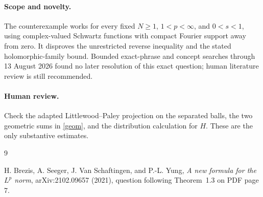 \documentclass[11pt]{article}
\begin{document}
\paragraph{Scope and novelty.}
The counterexample works for every fixed $N\ge1$, $1<p<\infty$, and
$0<s<1$, using complex-valued Schwartz functions with compact Fourier
support away from zero.  It disproves the unrestricted reverse inequality
and the stated holomorphic-family bound.  Bounded exact-phrase and concept
searches through 13 August 2026 found no later resolution of this exact
question; human literature review is still recommended.

\paragraph{Human review.}
Check the adapted Littlewood--Paley projection on the separated balls, the
two geometric sums in \eqref{geom}, and the distribution calculation for
$H$.  These are the only substantive estimates.

\begin{thebibliography}{9}
\raggedright
{}
H. Brezis, A. Seeger, J. Van Schaftingen, and P.-L. Yung,
\emph{A new formula for the $L^p$ norm}, arXiv:2102.09657 (2021),
question following Theorem~1.3 on PDF page 7.
\end{thebibliography}
\end{document}
